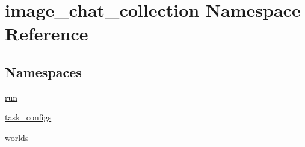 \hypertarget{namespaceimage__chat__collection}{}\section{image\+\_\+chat\+\_\+collection Namespace Reference}
\label{namespaceimage__chat__collection}
\subsection*{Namespaces}
\begin{DoxyCompactItemize}
\item 
 \hyperlink{namespaceimage__chat__collection_1_1run}{run}
\item 
 \hyperlink{namespaceimage__chat__collection_1_1task__configs}{task\+\_\+configs}
\item 
 \hyperlink{namespaceimage__chat__collection_1_1worlds}{worlds}
\end{DoxyCompactItemize}

